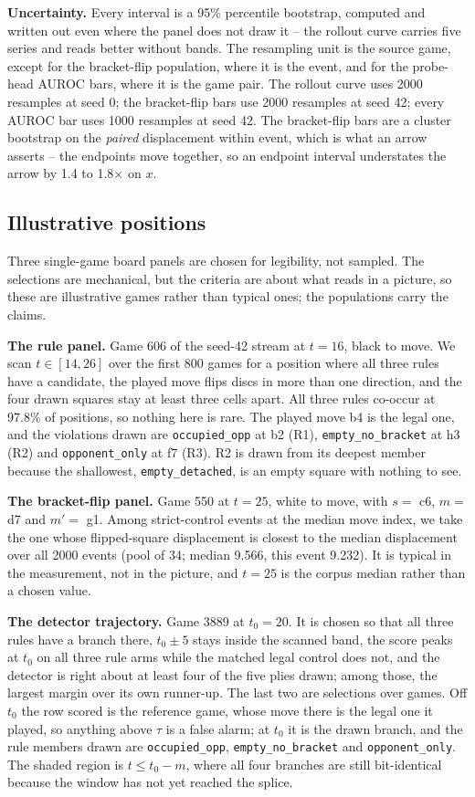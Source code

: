 \documentclass{article}
\begin{document}
\textbf{Uncertainty.} Every interval is a 95\% percentile bootstrap, computed and written out
even where the panel does not draw it -- the rollout curve carries five series and reads better
without bands. The resampling unit
is the source game, except for the bracket-flip population, where it is the event, and for the
probe-head AUROC bars, where it is the game pair. The rollout curve uses 2000 resamples at seed
0; the bracket-flip bars use 2000 resamples at seed 42; every AUROC bar uses 1000 resamples at
seed 42. The bracket-flip bars are a cluster bootstrap on the \emph{paired} displacement within
event, which is what an arrow asserts -- the endpoints move together, so an endpoint interval
understates the arrow by 1.4 to 1.8$\times$ on $x$.

\subsection{Illustrative positions}

Three single-game board panels are chosen for legibility, not sampled. The selections are
mechanical, but the criteria are about what reads in a picture, so these are illustrative games
rather than typical ones; the populations carry the claims.

\textbf{The rule panel.} Game 606 of the seed-42 stream at $t = 16$, black to move. We scan $t
\in [14, 26]$ over the first 800 games for a position where all three rules have a candidate, the
played move flips discs in more than one direction, and the four drawn squares stay at least
three cells apart. All three rules co-occur at 97.8\% of positions, so nothing here is rare. The
played move b4 is the legal one, and the violations drawn are \texttt{occupied\_opp} at b2 (R1),
\texttt{empty\_no\_bracket} at h3 (R2) and \texttt{opponent\_only} at f7 (R3). R2 is drawn from
its deepest member because the shallowest, \texttt{empty\_detached}, is an empty square with
nothing to see.

\textbf{The bracket-flip panel.} Game 550 at $t = 25$, white to move, with $s = $ c6, $m = $ d7
and $m' = $ g1. Among strict-control events at the median move index, we take the one whose
flipped-square displacement is closest to the median displacement over all 2000 events (pool of
34; median 9.566, this event 9.232). It is typical in the measurement, not in the picture, and
$t = 25$ is the corpus median rather than a chosen value.

\textbf{The detector trajectory.} Game 3889 at $t_0 = 20$. It is chosen so that all three rules
have a branch there, $t_0 \pm 5$ stays inside the scanned band, the score peaks at $t_0$ on all
three rule arms while the matched legal control does not, and the detector is right about at
least four of the five plies drawn; among those, the largest margin over its own runner-up. The
last two are selections over games. Off $t_0$ the row scored is the reference game, whose move
there is the legal one it played, so anything above $\tau$ is a false alarm; at $t_0$ it is the
drawn branch, and the rule members drawn are \texttt{occupied\_opp},
\texttt{empty\_no\_bracket} and \texttt{opponent\_only}. The shaded region is $t \le t_0 - m$,
where all four branches are still bit-identical because the window has not yet reached the
splice.
\end{document}
